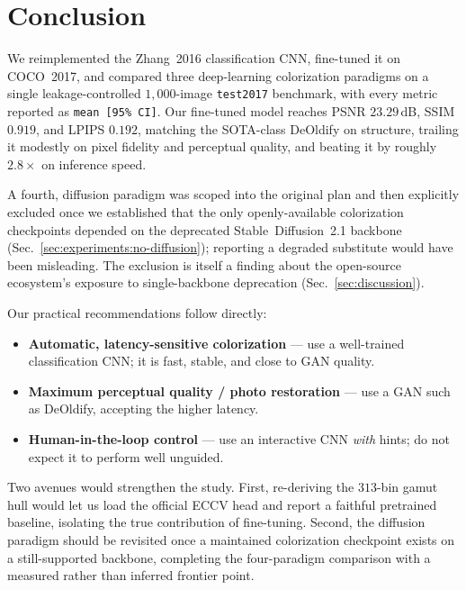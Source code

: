 \section{Conclusion}
\label{sec:conclusion}

We reimplemented the Zhang~2016 classification CNN, fine-tuned it on COCO~2017,
and compared three deep-learning colorization paradigms on a single
leakage-controlled $1{,}000$-image \texttt{test2017} benchmark, with every
metric reported as \texttt{mean [95\% CI]}. Our fine-tuned model reaches PSNR
$23.29$\,dB, SSIM $0.919$, and LPIPS $0.192$, matching the SOTA-class DeOldify
on structure, trailing it modestly on pixel fidelity and perceptual quality, and
beating it by roughly $2.8\times$ on inference speed.

A fourth, diffusion paradigm was scoped into the original plan and then
explicitly excluded once we established that the only openly-available
colorization checkpoints depended on the deprecated Stable~Diffusion~2.1
backbone (Sec.~\ref{sec:experiments:no-diffusion}); reporting a degraded
substitute would have been misleading. The exclusion is itself a finding about
the open-source ecosystem's exposure to single-backbone deprecation
(Sec.~\ref{sec:discussion}).

Our practical recommendations follow directly:
\begin{itemize}
  \item \textbf{Automatic, latency-sensitive colorization} --- use a
        well-trained classification CNN; it is fast, stable, and close to GAN
        quality.
  \item \textbf{Maximum perceptual quality / photo restoration} --- use a GAN
        such as DeOldify, accepting the higher latency.
  \item \textbf{Human-in-the-loop control} --- use an interactive CNN
        \emph{with} hints; do not expect it to perform well unguided.
\end{itemize}

Two avenues would strengthen the study. First, re-deriving the $313$-bin gamut
hull would let us load the official ECCV head and report a faithful pretrained
baseline, isolating the true contribution of fine-tuning. Second, the diffusion
paradigm should be revisited once a maintained colorization checkpoint exists
on a still-supported backbone, completing the four-paradigm comparison with a
measured rather than inferred frontier point.
